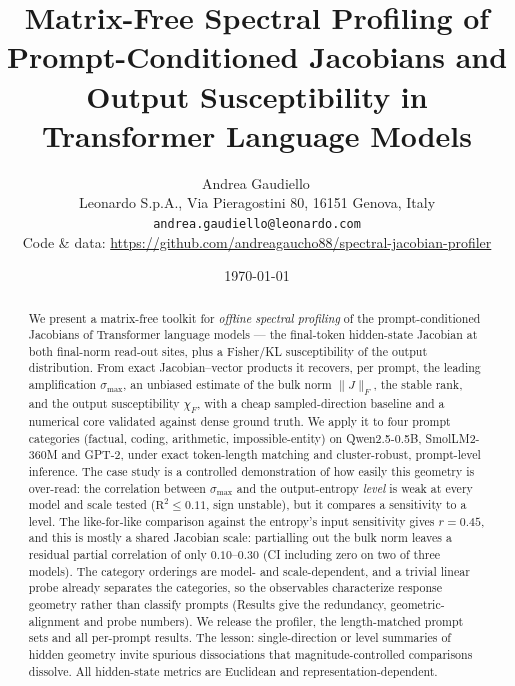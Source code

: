 \documentclass{article}
\title{\bfseries Matrix-Free Spectral Profiling of Prompt-Conditioned Jacobians and Output Susceptibility in Transformer Language Models}
\author{%
  Andrea Gaudiello\,\orcidlink{0000-0001-7721-8217}\\
  Leonardo S.p.A., Via Pieragostini 80, 16151 Genova, Italy\\
  \texttt{andrea.gaudiello@leonardo.com}\\[3pt]
  Code \& data: \url{https://github.com/andreagaucho88/spectral-jacobian-profiler}
}
\date{\today}
\begin{document}
\maketitle
{}

\begin{abstract}
We present a matrix-free toolkit for \emph{offline spectral profiling} of the prompt-conditioned
Jacobians of Transformer language models --- the final-token hidden-state Jacobian at both final-norm
read-out sites, plus a Fisher/KL susceptibility of the output distribution. From exact Jacobian--vector
products it recovers, per prompt, the leading amplification $\sigma_{\max}$, an unbiased estimate of
the bulk norm $\|J\|_F$, the stable rank, and the output susceptibility $\chi_F$, with a cheap
sampled-direction baseline and a numerical core validated against dense ground truth. We apply it to
four prompt categories (factual, coding, arithmetic, impossible-entity) on Qwen2.5-0.5B,
SmolLM2-360M and GPT-2, under exact token-length matching and cluster-robust, prompt-level inference.
The case study is a controlled demonstration of how easily this geometry is over-read: the correlation
between $\sigma_{\max}$ and the output-entropy \emph{level} is weak at every model and scale tested
($\mathrm{R}^2\le0.11$, sign unstable), but it compares a sensitivity to a level. The like-for-like
comparison against the entropy's input sensitivity gives $r=0.45$, and this is mostly a shared Jacobian
scale: partialling out the bulk norm leaves a residual partial correlation of only $0.10$--$0.30$ (CI
including zero on two of three models). The category orderings are model- and scale-dependent, and a
trivial linear probe already separates the categories, so the observables characterize response
geometry rather than classify prompts (Results give the redundancy, geometric-alignment and probe
numbers). We release the profiler, the length-matched prompt sets and all per-prompt results. The
lesson: single-direction or level summaries of hidden geometry invite spurious dissociations that
magnitude-controlled comparisons dissolve. All hidden-state metrics are Euclidean and
representation-dependent.
\end{abstract}

\end{document}
